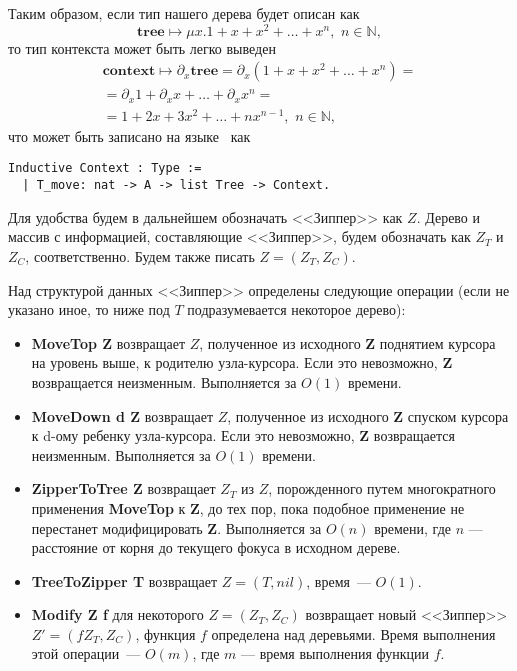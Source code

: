 Таким образом, если тип нашего дерева будет описан как
\begin{equation*}
\textbf{tree} \mapsto \mu x. 1 + x + x^2 + \dotsc + x^n, \,\, n \in \mathbb{N},
\end{equation*}   
то тип контекста может быть легко выведен
\begin{multline*}
\textbf{context} \mapsto \partial_x \textbf{tree} = \partial_x \left( 1 + x + x^2 + \dotsc + x^n \right)  = \\
= \partial_x 1 + \partial_x x + \dotsc + \partial_x x^n = \\
= 1 + 2x + 3x^2 + \dotsc + nx^{n-1}, \,\, n \in \mathbb{N},
\end{multline*}
что может быть записано на языке \tcoq~как
\begin{Verbatim}[fontsize=\small]
Inductive Context : Type :=
  | T_move: nat -> A -> list Tree -> Context.
\end{Verbatim}

Для удобства будем в дальнейшем обозначать <<Зиппер>> как $Z$. Дерево и массив с информацией, составляющие <<Зиппер>>, будем обозначать как $Z_T$ и $Z_C$, соответственно. Будем также писать $Z = (Z_T, Z_C)$.

Над структурой данных <<Зиппер>> определены следующие операции (если не указано иное, то ниже под $T$ подразумевается некоторое дерево):
\begin{itemize}
\item \textbf{MoveTop Z} возвращает $Z$, полученное из исходного \textbf{Z} поднятием курсора на уровень выше, к родителю узла-курсора. Если это невозможно, \textbf{Z} возвращается неизменным. Выполняется за $O(1)$ времени.
\item \textbf{MoveDown d Z} возвращает $Z$, полученное из исходного \textbf{Z} спуском курсора к d-ому ребенку узла-курсора. Если это невозможно, \textbf{Z} возвращается неизменным. Выполняется за $O(1)$ времени.
\item \textbf{ZipperToTree Z} возвращает $Z_T$ из $Z$, порожденного путем многократного применения \textbf{MoveTop} к \textbf{Z}, до тех пор, пока подобное применение не перестанет модифицировать \textbf{Z}. Выполняется за $O(n)$ времени, где $n$ --- расстояние от корня до текущего фокуса в исходном дереве.
\item \textbf{TreeToZipper T} возвращает $Z = (T, nil)$, время~--- $O(1)$.
\item \textbf{Modify Z f} для некоторого $Z = (Z_T, Z_C)$ возвращает новый <<Зиппер>> $Z' = (f Z_T, Z_C)$, функция $f$ определена над деревьями. Время выполнения этой операции~--- $O(m)$, где $m$ --- время выполнения функции $f$.  
\end{itemize}


